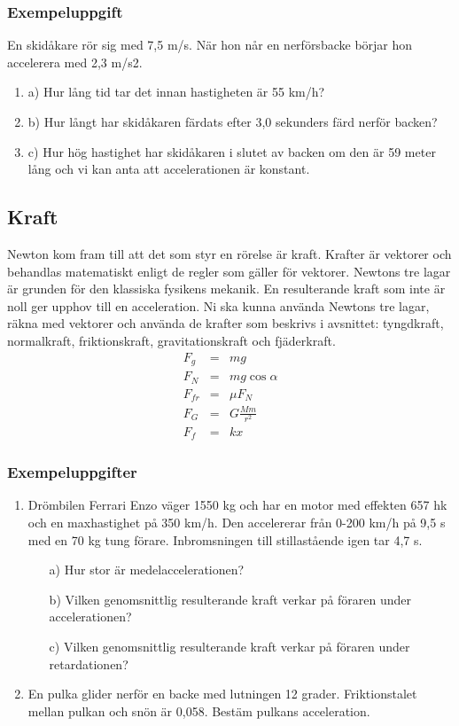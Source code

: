 \documentclass[10pt, titlepage, oneside, a4paper]{article}
\newcommand{\Subsection}[1]{\vspace{-4pt}\subsection{#1}\vspace{-8pt}}
\newcommand{\Subsubsection}[1]{\vspace{-4pt}\subsubsection{#1}\vspace{-8pt}}
\begin{document}
    \Subsubsection{Exempeluppgift}
    En skidåkare rör sig med 7,5 m/s. När hon når en
    nerförsbacke börjar hon accelerera med 2,3 m/s2.
    \begin{enumerate}
        \item{a)} Hur lång tid tar det innan hastigheten är 55 km/h?
        \item{b)} Hur långt har skidåkaren färdats efter 3,0
        sekunders färd nerför backen?
        \item{c)} Hur hög hastighet har skidåkaren i slutet av
        backen om den är 59 meter lång och vi kan anta att
        accelerationen är konstant.
    \end{enumerate}
    \newpage
    \Subsection{Kraft}
    Newton kom fram till att det som styr en rörelse är kraft. Krafter är vektorer och behandlas matematiskt enligt
    de regler som gäller för vektorer. Newtons tre lagar är grunden för den klassiska fysikens mekanik. En resulterande
    kraft som inte är noll ger upphov till en acceleration. Ni ska kunna använda Newtons tre lagar, räkna med vektorer
    och använda de krafter som beskrivs i avsnittet: tyngdkraft, normalkraft, friktionskraft, gravitationskraft och fjäderkraft.
    \begin{eqnarray}
        F_g&=&m g \\
        F_N&=&m g \cos{\alpha}\\
        F_{fr}&=&\mu F_N\\
        F_G &=& G\frac{M m}{r^2} \\
        F_f &=& kx
    \end{eqnarray}
    \Subsubsection{Exempeluppgifter}
    \begin{enumerate}
        \item Drömbilen Ferrari Enzo väger 1550 kg och har en motor med effekten 657 hk
        och en maxhastighet på 350 km/h. Den accelererar från 0-200 km/h på 9,5 s
        med en 70 kg tung förare. Inbromsningen till stillastående igen tar 4,7 s.
        \begin{itemize}
            \item[a)] Hur stor är medelaccelerationen?
            \item[b)] Vilken genomsnittlig resulterande kraft verkar på föraren under
            accelerationen?
            \item[c)] Vilken genomsnittlig resulterande kraft verkar på föraren under
            retardationen?
        \end{itemize}
        \item En pulka glider nerför en backe med lutningen 12 grader. Friktionstalet mellan
        pulkan och snön är 0,058. Bestäm pulkans acceleration.
    \end{enumerate}
\end{document}
